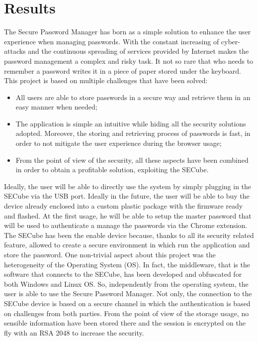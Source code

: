 \chapter{Results}
\label{sec:results}

The Secure Password Manager has born as a simple solution to enhance the user experience when managing passwords. With the constant increasing of cyber-attacks and the continuous spreading of services provided by Internet makes the password management a complex and risky task. It not so rare that who needs to remember a password writes it in a piece of paper stored under the keyboard.\newline\newline
This project is based on multiple challenges that have been solved:
\begin{itemize}
	\item All users are able to store passwords in a secure way and retrieve them in an easy manner when needed;
	\item The application is simple an intuitive while hiding all the security solutions adopted. Moreover, the storing and retrieving process of passwords is fast, in order to not mitigate the user experience during the browser usage;
	\item From the point of view of the security, all these aspects have been combined in order to obtain a profitable solution, exploiting the SECube.
\end{itemize}

Ideally, the user will be able to directly use the system by simply plugging in the SECube via the USB port. Ideally in the future, the user will be able to buy the device already enclosed into a custom plastic package with the firmware ready and flashed. At the first usage, he will be able to setup the master password that will be used to authenticate a manage the passwords via the Chrome extension. The SECube has been the enable device because, thanks to all its security related feature, allowed to create a secure environment in which run the application and store the password.\newline\newline
One non-trivial aspect about this project was the heterogeneity of the Operating System (OS). In fact, the middleware, that is the software that connects to the SECube, has been developed and obfuscated for both Windows and Linux OS. So, independently from the operating system, the user is able to use the Secure Password Manager. Not only, the connection to the SECube device is based on a secure channel in which the authentication is based on challenges from both parties. From the point of view of the storage usage, no sensible information have been stored there and the session is encrypted on the fly with an RSA 2048 to increase the security. 



